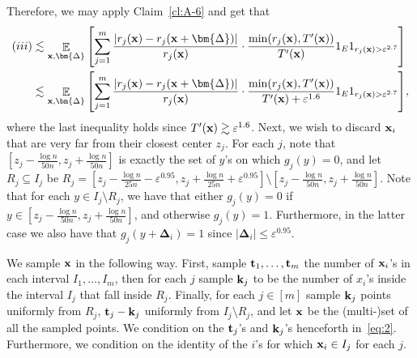 \documentclass[10pt,a4paper]{article}
\newcommand\card[1]{\left| {#1} \right|}
\newcommand\Expect[2]{{\mathop{\mathbb{E}}_{#1}\left[ {#2} \right]}}
\newcommand\eps{\varepsilon}
\renewcommand\leq{\leqslant}
\newcommand{\rom}[1]{\uppercase\expandafter{\romannumeral #1\relax}}
\newcommand{\De}{\Delta}
\def\gg{\gtrsim}
\def\ll{\lesssim}
\begin{document}
Therefore, we may apply Claim~\ref{cl:A-6} and get that
\begin{align}
(\rom{3})&\ll \Expect{{\bf x},\bm{\De}}{\sum\limits_{j=1}^{m} \frac{|r_j({\bf x}) - r_j({\bf x}+\bm{\De})|}{r_j({\bf x})} \cdot \frac{\min(r_j({\bf x}), T'({\bf x}))}{T'({\bf x})}
1_E 1_{r_j({\bf x}) >\eps^{2.7}}} \notag\\\label{eq:2}
&\ll \Expect{{\bf x},\bm{\De}}{\sum\limits_{j=1}^{m} \frac{|r_j({\bf x}) - r_j({\bf x}+\bm{\De})|}{r_j({\bf x})} \cdot \frac{\min(r_j({\bf x}), T'({\bf x}))}{T'({\bf x})+\eps^{1.6}}1_E 1_{r_j({\bf x}) >\eps^{2.7}}},
\end{align}
where the last inequality holds since $T'({\bf x})\gg \eps^{1.6}$. Next, we wish to discard ${\bf x}_i$ that are very far from their closest center $z_j$.
For each $j$, note that $\left[z_j-\frac{\log n}{50 n},z_j+\frac{\log n}{50 n}\right]$ is exactly the set of $y$'s on which
$g_j(y) = 0$, and let $R_j\subseteq I_j$ be $R_j = \left[z_j-\frac{\log n}{25 n}-\eps^{0.95},z_j+\frac{\log n}{25n}+\eps^{0.95}\right] \setminus
\left[z_j-\frac{\log n}{50 n},z_j+\frac{\log n}{50 n}\right]$.
Note that for each $y\in I_j\setminus R_j$, we have that either $g_j(y) = 0$ if $y\in \left[z_j-\frac{\log n}{50 n},z_j+\frac{\log n}{50 n}\right]$, and otherwise $g_j(y) = 1$.
Furthermore, in the latter case we also have that $g_j(y+\bm{\De}_i) = 1$ since $\card{\bm{\De}_i}\leq \eps^{0.95}$.

We sample ${\bf x}$ in the following way. First, sample ${\bf t}_1,\ldots,{\bf t}_m$ the number of ${\bf x}_i$'s in each interval $I_1,\ldots,I_m$,
then for each $j$ sample ${\bf k}_j$ to be the number of $x_i$'s inside the interval $I_j$ that fall inside $R_j$.
Finally, for each $j\in[m]$ sample ${\bf k}_j$ points uniformly from $R_j$, ${\bf t}_j - {\bf k}_j$ uniformly from $I_j\setminus R_j$, and let ${\bf x}$
be the (multi-)set of all the sampled points. We condition on the ${\bf t}_j$'s and ${\bf k}_j$'s henceforth in~\eqref{eq:2}. Furthermore, we condition
on the identity of the $i$'s for which ${\bf x}_i\in I_j$ for each $j$.
\end{document}
